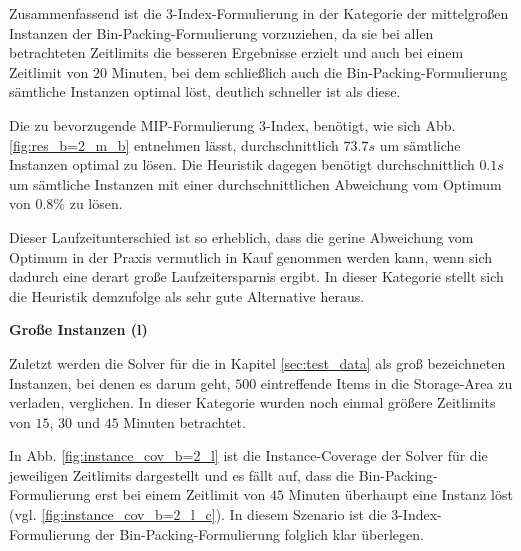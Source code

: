 Zusammenfassend ist die 3-Index-Formulierung in der Kategorie der mittelgroßen Instanzen der Bin-Packing-Formulierung vorzuziehen,
da sie bei allen betrachteten Zeitlimits die besseren Ergebnisse erzielt und auch bei einem Zeitlimit von $20$ Minuten, bei dem schließlich auch die Bin-Packing-Formulierung sämtliche Instanzen optimal löst, deutlich schneller ist als diese.

Die zu bevorzugende MIP-Formulierung 3-Index, benötigt, wie sich Abb. \ref{fig:res_b=2_m_b} entnehmen lässt, durchschnittlich
$73.7s$ um sämtliche Instanzen optimal zu lösen. Die Heuristik dagegen benötigt durchschnittlich $0.1s$ um sämtliche Instanzen
mit einer durchschnittlichen Abweichung vom Optimum von $0.8 \%$ zu lösen.

Dieser Laufzeitunterschied ist so erheblich, dass die gerine Abweichung vom Optimum in der Praxis vermutlich in Kauf genommen werden kann,
wenn sich dadurch eine derart große Laufzeitersparnis ergibt. In dieser Kategorie stellt sich die Heuristik demzufolge als sehr gute Alternative
heraus.

\textbf{Große Instanzen (l)}

Zuletzt werden die Solver für die in Kapitel \ref{sec:test_data} als groß bezeichneten Instanzen, bei denen es darum geht,
$500$ eintreffende Items in die Storage-Area zu verladen, verglichen. In dieser Kategorie wurden noch einmal größere Zeitlimits von
$15$, $30$ und $45$ Minuten betrachtet.

In Abb. \ref{fig:instance_cov_b=2_l} ist die Instance-Coverage der Solver für die jeweiligen Zeitlimits dargestellt und es fällt auf,
dass die Bin-Packing-Formulierung erst bei einem Zeitlimit von $45$ Minuten überhaupt eine Instanz löst (vgl. \ref{fig:instance_cov_b=2_l_c}).
In diesem Szenario ist die 3-Index-Formulierung der Bin-Packing-Formulierung folglich klar überlegen.

